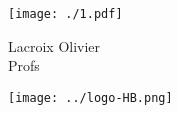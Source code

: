 \documentclass[a4paper,11pt,fleqn]{article}
\begin{document}
\Huge

\begin{block} %
{}\hfill {}



\vspace{1cm}


\begin{minipage}{0.3\linewidth}
\texttt{[image: ./1.pdf]}
\end{minipage}
{}\hfill {}
\begin{minipage}{0.33\linewidth}
{}\hfill {}
{}\hfill {}


\begin{center}
	Lacroix Olivier\\
	Profs
\end{center}

	

\end{minipage}
{}\hfill {}
\begin{minipage}{0.2\linewidth}
	\texttt{[image: ../logo-HB.png]}
\end{minipage}
{}\hfill {}



\end{block}
\end{document}
